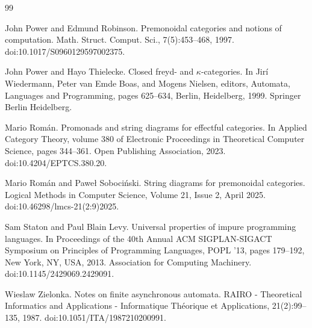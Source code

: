 \begin{thebibliography}{99}
\par\noindent    John Power and Edmund Robinson.  Premonoidal categories and notions of computation.  Math. Struct. Comput. Sci., 7(5):453--468, 1997.  doi:10.1017/S0960129597002375.  

\par\noindent    John Power and Hayo Thielecke.  Closed freyd- and $\kappa$-categories.  In Jirí Wiedermann, Peter van Emde Boas, and Mogens Nielsen, editors, Automata, Languages and Programming, pages 625--634, Berlin, Heidelberg, 1999. Springer Berlin Heidelberg.  

\par\noindent    Mario Román.  Promonads and string diagrams for effectful categories.  In Applied Category Theory, volume 380 of Electronic Proceedings in Theoretical Computer Science, pages 344--361. Open Publishing Association, 2023.  doi:10.4204/EPTCS.380.20.  

\par\noindent    Mario Román and Paweł Sobociński.  String diagrams for premonoidal categories.  Logical Methods in Computer Science, Volume 21, Issue 2, April 2025.  doi:10.46298/lmcs-21(2:9)2025.  

\par\noindent    Sam Staton and Paul Blain Levy.  Universal properties of impure programming languages.  In Proceedings of the 40th Annual ACM SIGPLAN-SIGACT Symposium on Principles of Programming Languages, POPL ’13, pages 179--192, New York, NY, USA, 2013. Association for Computing Machinery.  doi:10.1145/2429069.2429091.  

\par\noindent    Wieslaw Zielonka.  Notes on finite asynchronous automata.  RAIRO - Theoretical Informatics and Applications - Informatique Théorique et Applications, 21(2):99--135, 1987.  doi:10.1051/ITA/1987210200991.  

\end{thebibliography}
